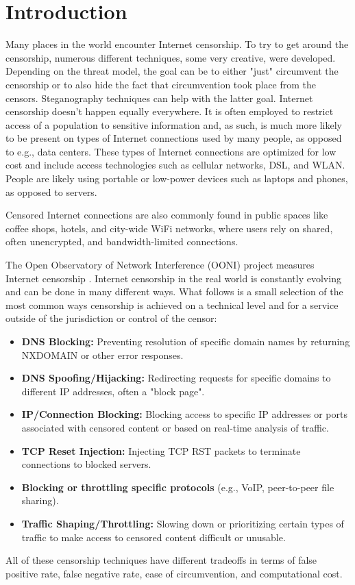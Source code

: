 
\chapter{Introduction}

Many places in the world encounter Internet censorship.
To try to get around the censorship, numerous different techniques, some very creative, were developed.
Depending on the threat model, the goal can be to either "just" circumvent the censorship or to also hide the fact that circumvention took place from the censors.
Steganography \cite{wiki:Steganography} techniques \cite{wiki:List_of_steganography_techniques} can help with the latter goal.
Internet censorship doesn't happen equally everywhere.
It is often employed to restrict access of a population to sensitive information and, as such, is much more likely to be present on types of Internet connections used by many people, as opposed to e.g., data centers.
These types of Internet connections are optimized for low cost and include access technologies such as cellular networks, DSL, and WLAN.
People are likely using portable or low-power devices such as laptops and phones, as opposed to servers.

Censored Internet connections are also commonly found in public spaces like coffee shops, hotels, and city-wide WiFi networks, where users rely on shared, often unencrypted, and bandwidth-limited connections.


The Open Observatory of Network Interference (OONI) project measures Internet censorship \cite{OONI}.
Internet censorship in the real world is constantly evolving and can be done in many different ways.
What follows is a small selection of the most common ways censorship is achieved on a technical level and for a service outside of the jurisdiction or control of the censor:
\begin{itemize}
	\item \noindent\textbf{DNS Blocking:} Preventing resolution of specific domain names by returning NXDOMAIN or other error responses.
	\item \noindent\textbf{DNS Spoofing/Hijacking:} Redirecting requests for specific domains to different IP addresses, often a "block page".
	\item \noindent\textbf{IP/Connection Blocking:} Blocking access to specific IP addresses or ports associated with censored content or based on real-time analysis of traffic.
	\item \noindent\textbf{TCP Reset Injection:} Injecting TCP RST packets to terminate connections to blocked servers.
	\item \noindent\textbf{Blocking or throttling specific protocols} (e.g., VoIP, peer-to-peer file sharing).
	\item \noindent\textbf{Traffic Shaping/Throttling:} Slowing down or prioritizing certain types of traffic to make access to censored content difficult or unusable.
\end{itemize}
All of these censorship techniques have different tradeoffs in terms of false positive rate, false negative rate, ease of circumvention, and computational cost.

